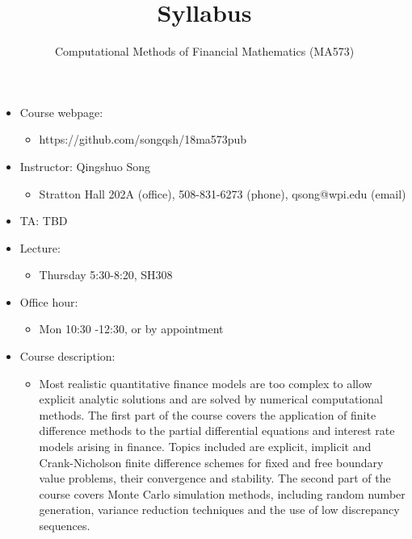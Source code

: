 \documentclass[11pt]{amsart}
\title{Syllabus}
\author{Computational Methods of Financial Mathematics (MA573)}
\begin{document}
\maketitle

\begin{itemize}
 
 \item Course webpage: 
\begin{itemize}
 \item  https://github.com/songqsh/18ma573pub
\end{itemize}

 \item Instructor: Qingshuo Song 
\begin{itemize}
 \item  Stratton Hall 202A (office),  508-831-6273 (phone), qsong@wpi.edu (email)
\end{itemize}
\item TA: TBD
\item Lecture:
\begin{itemize}
 \item Thursday 5:30-8:20,  SH308
\end{itemize}

 \item Office hour: 
\begin{itemize}
 \item Mon 10:30 -12:30, or by appointment
\end{itemize}

\item Course description:
\begin{itemize}
 \item Most realistic quantitative finance models are too complex to allow explicit analytic solutions and are solved by numerical computational methods. The first part of the course covers the application of finite difference methods to the partial differential equations and interest rate models arising in finance. Topics included are explicit, implicit and Crank-Nicholson finite difference schemes for fixed and free boundary value problems, their convergence and stability. The second part of the course covers Monte Carlo simulation methods, including random number generation, variance reduction techniques and the use of low discrepancy sequences. 
\end{itemize}


\end{itemize}
\end{document}
